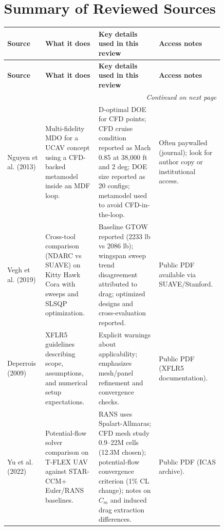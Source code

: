 \chapter{Summary of Reviewed Sources}
\begingroup
\small
\setlength{\tabcolsep}{6pt}
\renewcommand{\arraystretch}{1.25}
\begin{longtable}{p{0.16\linewidth} p{0.23\linewidth} p{0.26\linewidth} p{0.23\linewidth}}
\toprule
\textbf{Source} & \textbf{What it does} & \textbf{Key details used in this review} & \textbf{Access notes} \\
\midrule
\endfirsthead
\toprule
\textbf{Source} & \textbf{What it does} & \textbf{Key details used in this review} & \textbf{Access notes} \\
\midrule
\endhead
\midrule
\multicolumn{4}{r}{\textit{Continued on next page}} \\
\midrule
\endfoot
\bottomrule
\endlastfoot

Nguyen et al. (2013) \cite{Nguyen2013MFM} &
Multi-fidelity MDO for a UCAV concept using a CFD-backed metamodel inside an MDF loop. &
D-optimal DOE for CFD points; CFD cruise condition reported as Mach 0.85 at 38{,}000 ft and 2 deg; DOE size reported as 20 configs; metamodel used to avoid CFD-in-the-loop. &
Often paywalled (journal); look for author copy or institutional access. \\

Vegh et al. (2019) \cite{Vegh2019NDARCSUAVE} &
Cross-tool comparison (NDARC vs SUAVE) on Kitty Hawk Cora with sweeps and SLSQP optimization. &
Baseline GTOW reported (2233 lb vs 2086 lb); wingspan sweep trend disagreement attributed to drag; optimized designs and cross-evaluation reported. &
Public PDF available via SUAVE/Stanford. \\

Deperrois (2009) \cite{Deperrois2009XFLR5} &
XFLR5 guidelines describing scope, assumptions, and numerical setup expectations. &
Explicit warnings about applicability; emphasizes mesh/panel refinement and convergence checks. &
Public PDF (XFLR5 documentation). \\

Yu et al. (2022) \cite{Yu2022ICAS} &
Potential-flow solver comparison on T-FLEX UAV against STAR-CCM+ Euler/RANS baselines. &
RANS uses Spalart-Allmaras; CFD mesh study 0.9--22M cells (12.3M chosen); potential-flow convergence criterion (1\% CL change); notes on $C_m$ and induced drag extraction differences. &
Public PDF (ICAS archive). \\


\end{longtable}

